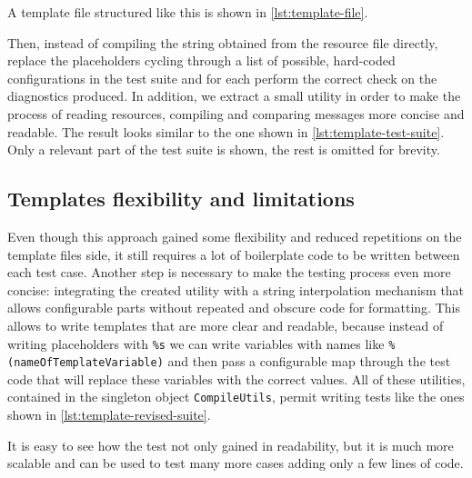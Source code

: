 \documentclass[12pt,a4paper,openright,twoside]{book}
\begin{document}
A template file structured like this is shown in
\cref{lst:template-file}.
%

%
Then, instead of compiling the string obtained from the
resource file directly, replace the placeholders cycling through a list of
possible, hard-coded configurations in the test suite and for each perform the
correct check on the diagnostics produced.
%
In addition, we extract a small utility in order to make the process of reading
resources, compiling and comparing messages more concise and readable. The
result looks similar to the one shown in \cref{lst:template-test-suite}. Only a
relevant part of the test suite is shown, the rest is omitted for brevity.



\subsection{Templates flexibility and limitations}

Even though this approach gained some flexibility and reduced repetitions on the
template files side, it still requires a lot of boilerplate code to be written
between each test case. Another step is necessary to make the testing process
even more concise: integrating the created utility with a string interpolation
mechanism that allows configurable parts without repeated and obscure code for
formatting. 
%
This allows to write templates that are more clear and readable, because instead
of writing placeholders with \lstinline{%s} we can write variables with names 
like \lstinline{%(nameOfTemplateVariable)} and then pass a configurable map 
through the test code that will replace these variables with the correct values.
All of these utilities, contained in the singleton object \lstinline{CompileUtils},
permit writing tests like the ones shown in \cref{lst:template-revised-suite}.
%

%
It is easy to see how the test not only gained in readability, but it is much
more scalable and can be used to test many more cases adding only a few lines of
code. 
\end{document}
